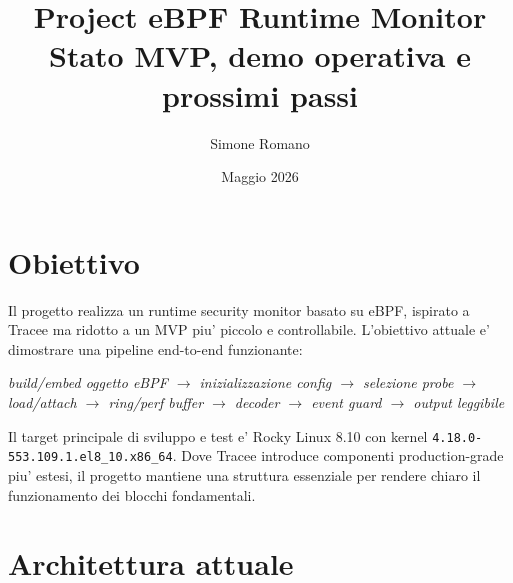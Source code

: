 \documentclass[11pt,a4paper]{article}
\title{\textbf{Project eBPF Runtime Monitor}\\
\large Stato MVP, demo operativa e prossimi passi}
\author{Simone Romano}
\date{Maggio 2026}
\begin{document}
\maketitle

\section{Obiettivo}

Il progetto realizza un runtime security monitor basato su eBPF, ispirato a
Tracee ma ridotto a un MVP piu' piccolo e controllabile. L'obiettivo attuale e'
dimostrare una pipeline end-to-end funzionante:

\begin{center}
\textit{build/embed oggetto eBPF $\rightarrow$ inizializzazione config
$\rightarrow$ selezione probe $\rightarrow$ load/attach $\rightarrow$ ring/perf buffer
$\rightarrow$ decoder $\rightarrow$ event guard $\rightarrow$ output leggibile}
\end{center}

Il target principale di sviluppo e test e' Rocky Linux 8.10 con kernel
\texttt{4.18.0-553.109.1.el8\_10.x86\_64}. Dove Tracee introduce componenti
production-grade piu' estesi, il progetto mantiene una struttura essenziale per
rendere chiaro il funzionamento dei blocchi fondamentali.

\section{Architettura attuale}
\end{document}
